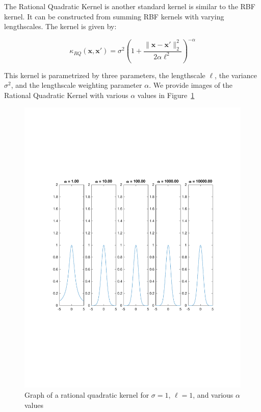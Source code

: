 \documentclass{article}
\newcommand{\bx}{\boldsymbol{x}}
\begin{document}
The Rational Quadratic Kernel is another standard kernel is similar to the RBF kernel. It can be constructed from
summing RBF kernels with varying lengthscales. The kernel is given by:

\[
  \kappa_{RQ}(\bx, \bx') = \sigma^2 \left( 1 + \frac{\| \bx - \bx' \|_{2}^{2}}{2 \alpha \ell^2} \right)^{-\alpha}
\]

This kernel is parametrized by three parameters, the lengthscale $\ell$, the variance $\sigma^2$, and the lengthscale
weighting parameter $\alpha$\cite{duvenaud_automatic_2014}. We provide images of the Rational Quadratic Kernel with
various $\alpha$ values in Figure~\ref{fig:rqk}

\pagebreak

\begin{figure}[H]
  \centering
  \caption{Graph of a rational quadratic kernel for $\sigma = 1$, $\ell = 1$, and various $\alpha$ values}
  \label{fig:rqk}
  \includegraphics[trim={0 7.5cm 0 7cm},clip,scale=0.6]{rqk}
\end{figure}
\end{document}
